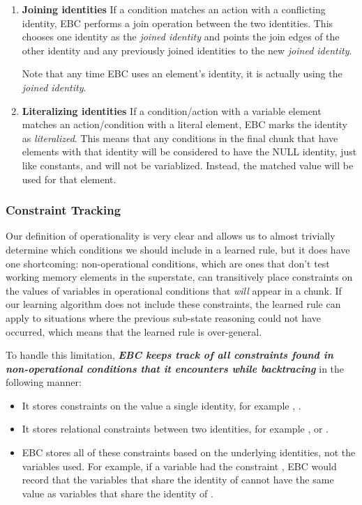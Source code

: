 \begin{enumerate}
	\item \textbf{Joining identities} \newline 
	If a condition matches an action with a conflicting identity, EBC performs a join operation between the two identities. This chooses one identity as the \textit{joined identity} and points the join edges of the other identity and any previously joined identities to the new \textit{joined identity}.

	Note that any time EBC uses an element's identity, it is actually using the \textit{joined identity}.
	
	\item \textbf{Literalizing identities} \newline
	If a condition/action with a variable element matches an action/condition with a literal element, EBC marks the identity as \textit{literalized}.  This means that any conditions in the final chunk that have elements with that identity will be considered to have the NULL identity, just like constants, and will not be variablized.  Instead, the matched value will be used for that element.
\end{enumerate}

\subsubsection{Constraint Tracking}

Our definition of operationality is very clear and allows us to almost trivially determine which conditions we should include in a learned rule, but it does have one shortcoming: non-operational conditions, which are ones that don't test working memory elements in the superstate, can transitively place constraints on the values of variables in operational conditions that \textit{will} appear in a chunk.  If our learning algorithm does not include these constraints, the learned rule can apply to situations where the previous sub-state reasoning could not have occurred, which means that the learned rule is over-general.

To handle this limitation, \textbf{\textit{EBC keeps track of all constraints found in \\ non-operational conditions that it encounters while backtracing}} in the following manner:

\begin{itemize}
	\item It stores constraints on the value a single identity, for example , .
	\item It stores relational constraints between two identities, for example ,   or  .  
	\item EBC stores all of these constraints based on the underlying identities, not the variables used.  For example, if a variable  had the constraint , EBC would record that the variables that share the identity of  cannot have the same value as variables that share the identity of .
\end{itemize}

